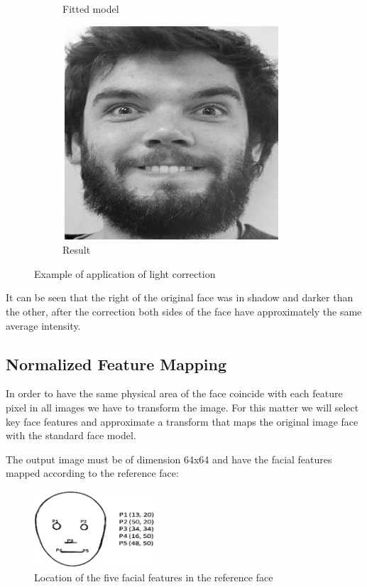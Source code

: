 \documentclass[12pt,a4paper,titlepage]{article}
\begin{document}
\begin{figure}[H]
\begin{subfigure}{0.3\textwidth}
		\caption{Fitted model}
	\end{subfigure}	
	\quad
	\begin{subfigure}{0.3\textwidth}
		\centering
		\includegraphics[width=\textwidth]{lightCorrection3.jpg}
		\caption{Result}
	\end{subfigure}
	\caption{Example of application of light correction}
\end{figure}

It can be seen that the right of the original face was in shadow and darker than the other, after the correction both sides of the face have approximately the same average intensity.

\subsection{Normalized Feature Mapping}

In order to have the same physical area of the face coincide with each feature pixel in all images we have to transform the image. For this matter we will select key face features and approximate a transform that maps the original image face with the standard face model. 

The output image must be of dimension 64x64 and have the facial features mapped according to the reference face:

\begin{figure}[H]
	\centering
	\includegraphics[width=0.4\textwidth]{facialFeatures}
	\caption{Location of the five facial features in the reference face}
\end{figure}
\end{document}

